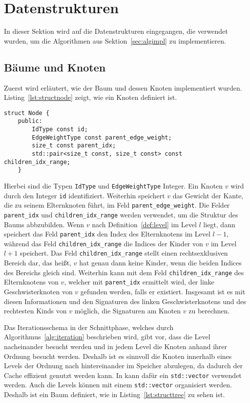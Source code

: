 \section{Datenstrukturen}
In dieser Sektion wird auf die Datenstrukturen eingegangen, die verwendet wurden, um die Algorithmen aus Sektion~\ref{sec:algimpl} zu implementieren.
\subsection{Bäume und Knoten}
Zuerst wird erläutert, wie der Baum und dessen Knoten implementiert wurden.
Listing~\ref{lst:structnode} zeigt, wie ein Knoten definiert ist.
\begin{lstlisting}[caption={Definition von \texttt{struct Node}}, label={lst:structnode}]
struct Node {
    public:
        IdType const id;
        EdgeWeightType const parent_edge_weight;
        size_t const parent_idx;
        std::pair<size_t const, size_t const> const children_idx_range;
    }
\end{lstlisting}

Hierbei sind die Typen \texttt{IdType} und \texttt{EdgeWeightType} Integer.
Ein Knoten $v$ wird durch den Integer \texttt{id} identifiziert. 
Weiterhin speichert $v$ das Gewicht der Kante, die zu seinem Elternknoten führt, im Feld \texttt{parent\_edge\_weight}.
Die Felder \texttt{parent\_idx} und \texttt{children\_idx\_range} werden verwendet, um die Struktur des Baums abbzubilden.
Wenn $v$ nach Definition~\ref{def:level} im Level $l$ liegt, dann speichert das Feld \texttt{parent\_idx} den Index des Elternknotens im Level $l-1$, während das Feld \texttt{children\_idx\_range} die Indices der Kinder von $v$ im Level $l+1$ speichert.
Das Feld \texttt{children\_idx\_range} stellt einen rechtsexklusiven Bereich dar, das heißt, $v$ hat genau dann keine Kinder, wenn die beiden Indices des Bereichs gleich sind.
Weiterhin kann mit dem Feld \texttt{children\_idx\_range} des Elternknotens von $v$, welcher mit \texttt{parent\_idx} ermittelt wird, der linke Geschwisterknoten von $v$ gefunden werden, falls er existiert.
Insgesamt ist es mit diesen Informationen und den Signaturen des linken Geschwisterknotens und des rechtesten Kinds von $v$ möglich, die Signaturen am Knoten $v$ zu berechnen.

Das Iterationsschema in der Schnittphase, welches durch Algorithmus~\ref{alg:iteration} beschrieben wird, gibt vor, dass die Level nacheinander besucht werden und in jedem Level die Knoten anhand ihrer Ordnung besucht werden.
Deshalb ist es sinnvoll die Knoten innerhalb eines Levels der Ordnung nach hintereinander im Speicher abzulegen, da dadurch der Cache effizient genutzt werden kann.
In \Cpp{} kann dafür ein \texttt{std::vector} verwendet werden.
Auch die Levels können mit einem \texttt{std::vector} organisiert werden.
Deshalb ist ein Baum definiert, wie in Listing~\ref{lst:structtree} zu sehen ist.

